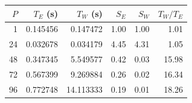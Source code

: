 \begin{center}
\small
\begin{tabular}{rrrrrr}
\toprule
$P$ & $T_E$ (s) & $T_W$ (s) & $S_E$ & $S_W$ & $T_W/T_E$ \\
\midrule
1 & 0.145456 & 0.147472 & 1.00 & 1.00 & 1.01 \\
24 & 0.032678 & 0.034179 & 4.45 & 4.31 & 1.05 \\
48 & 0.347345 & 5.549577 & 0.42 & 0.03 & 15.98 \\
72 & 0.567399 & 9.269884 & 0.26 & 0.02 & 16.34 \\
96 & 0.772748 & 14.113333 & 0.19 & 0.01 & 18.26 \\
\bottomrule
\end{tabular}
\end{center}
